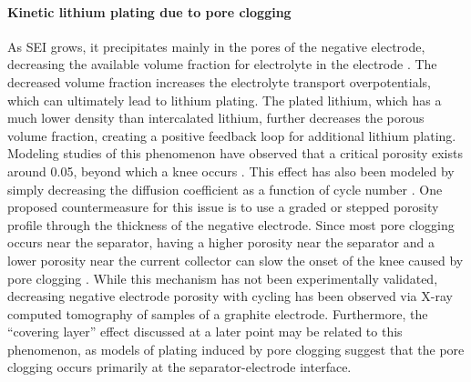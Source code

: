 \documentclass[journal=jpclcd,manuscript=article]{achemso}
\begin{document}
\paragraph{Kinetic lithium plating due to pore clogging}
As SEI grows, it precipitates mainly in the pores of the negative electrode, decreasing the available volume fraction for electrolyte in the electrode \cite{sikha_effect_2004}. The decreased volume fraction increases the electrolyte transport overpotentials, which can ultimately lead to lithium plating. The plated lithium, which has a much lower density than intercalated lithium\cite{yang_modeling_2017}, further decreases the porous volume fraction, creating a positive feedback loop for additional lithium plating\cite{yang_modeling_2017}. Modeling studies of this phenomenon have observed that a critical porosity exists around 0.05, beyond which a knee occurs \cite{yang_modeling_2017, muller_model-based_2019}. This effect has also been modeled by simply decreasing the diffusion coefficient as a function of cycle number \cite{keil_electrochemical_2020}. One proposed countermeasure for this issue is to use a graded or stepped porosity profile through the thickness of the negative electrode. Since most pore clogging occurs near the separator, having a higher porosity near the separator and a lower porosity near the current collector can slow the onset of the knee caused by pore clogging \cite{muller_model-based_2019}.
While this mechanism has not been experimentally validated, decreasing negative electrode porosity with cycling has been observed via X-ray computed tomography of samples of a graphite electrode.\cite{frisco_understanding_2016, rahe_nanoscale_2019} Furthermore, the ``covering layer'' effect discussed at a later point may be related to this phenomenon, as models of plating induced by pore clogging suggest that the pore clogging occurs primarily at the separator-electrode interface.\cite{yang_modeling_2017}
\end{document}
